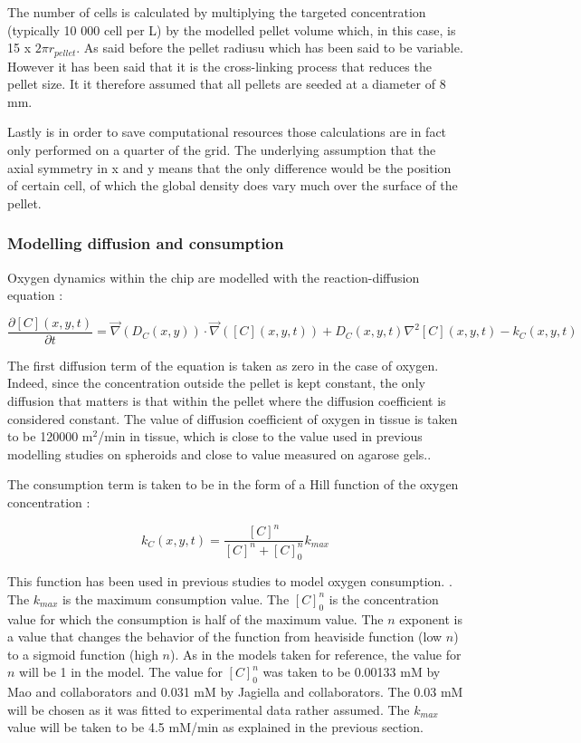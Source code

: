 \documentclass[11pt,a4paper]{article}
\begin{document}
 The number of cells is calculated by multiplying the targeted concentration (typically 10 000 cell per \textmu L) by the modelled pellet volume which, in this case, is 15 x $2 \pi r_{pellet}$. As said before the pellet radiusu which has been said to be variable. However it has been said that it is the cross-linking process that reduces the pellet size. It it therefore assumed that all pellets are seeded at a diameter of 8 mm.
 
Lastly is in order to save computational resources those calculations are in fact only performed on a quarter of the grid. The underlying assumption that the axial symmetry in x and y means that the only difference would be the position of certain cell, of which the global density does vary much over the surface of the pellet.

\subsubsection{Modelling diffusion and consumption}
Oxygen dynamics within the chip are modelled with the reaction-diffusion equation :

\[ \frac{\partial [C](x,y,t)}{\partial t} = \overrightarrow{\nabla}(D_C(x,y)) \cdot \overrightarrow{\nabla}( [C](x,y,t)) + D_C(x,y,t) \nabla^2 [C](x,y,t) -k_C(x,y,t) \] 

The first diffusion term of the equation is taken as zero in the case of oxygen. Indeed, since the concentration outside the pellet is kept constant, the only diffusion that matters is that within the pellet where the diffusion coefficient is considered constant. The value of diffusion coefficient of oxygen in tissue is taken to be 120000 \textmu m$^2$/min in tissue, which is close to the value used in previous modelling studies on spheroids\cite{Mao2018}\cite{Kempf2015} and close to value measured on agarose gels.\cite{McCabe1975}\cite{Figueiredo2018}.

The consumption term is taken to be in the form of a Hill function of the oxygen concentration : 

\[ k_C(x,y,t) = \frac{[C]^n}{[C]^n + [C]^n_{0}}k_{max}  \]

This function has been used in previous studies to model oxygen consumption. \cite{Mao2018}\cite{Kempf2015}\cite{Jagiella2016}. The $k_{max}$ is the maximum consumption value. The $[C]^n_{0}$ is the concentration value for which the consumption is half of the maximum value. The $n$  exponent is a value that changes the behavior of the function from heaviside function (low $n$) to a sigmoid function (high $n$). As in the models taken for reference, the value for $n$ will be 1 in the model. The value for $[C]^n_{0}$ was taken to be 0.00133 mM by Mao and collaborators and 0.031 mM by Jagiella and collaborators.\cite{Mao2018}\cite{Jagiella2016} The 0.03 mM will be chosen as it was fitted to experimental data rather assumed. The $k_{max}$ value will be taken to be 4.5 mM/min as explained in the previous section. 
\end{document}
